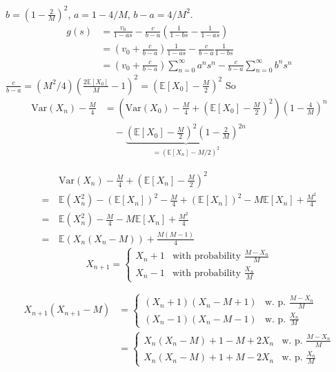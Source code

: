 \documentclass[letterpaper]{beamer}
\def\E{\mathbb E}
\def\V{\mathrm{Var}}
\begin{document}
\begin{frame}
$b=(1-\frac{2}{M})^2$, $a=1-4/M$, $b-a=4/M^2$.
\begin{align*}
g(s)&=\frac{v_0}{1-as}-\frac{c}{b-a}\left(\frac{1}{1-bs}-\frac{1}{1-as}\right)\\
&=\left(v_0+\frac{c}{b-a}\right)\frac{1}{1-as}-\frac{c}{b-a}\frac{1}{1-bs}\\
&=\left(v_0+\frac{c}{b-a}\right)\sum_{n=0}^{\infty}a^ns^n-\frac{c}{b-a}\sum_{n=0}^{\infty}b^ns^n
\end{align*}
$\frac{c}{b-a}=(M^2/4)\left(\frac{2\E[X_{0}]}{M}-1\right)^2=\left(\E[X_{0}]-\frac{M}{2}\right)^2$
So
\begin{align*}
\V(X_n)-\frac{M}{4}&=\left(\V(X_0)-\frac{M}{4}+\left(\E[X_{0}]-\frac{M}{2}\right)^2\right)\left(1-\frac{4}{M}\right)^n\\
&\quad-\underbrace{\left(\E[X_{0}]-\frac{M}{2}\right)^2\left(1-\frac{2}{M}\right)^{2n}}_{=(\E[X_n]-M/2)^2}
\end{align*}

\end{frame}
\begin{frame}
\begin{align*}
&\V(X_n)-\frac{M}{4}+(\E[X_n]-\frac{M}{2})^2\\
=\,&\E(X_n^2)-(\E[X_n])^2-\frac{M}{4}+(\E[X_n])^2-M\E[X_n]+\frac{M^2}{4}\\
=\,&\E(X_n^2)-\frac{M}{4}-M\E[X_n]+\frac{M^2}{4}\\
=\,&\E(X_n(X_n-M))+\frac{M(M-1)}{4}
\end{align*}
$$
X_{n+1}=
\begin{cases}
X_n+1 & \text{with probability } \frac{M-X_n}{M}\\
X_n-1 & \text{with probability } \frac{X_n}{M}
\end{cases}
$$

\begin{align*}
X_{n+1}(X_{n+1}-M)&=
\begin{cases}
(X_n+1)(X_n-M+1) & \text{w. p. } \frac{M-X_n}{M}\\
(X_n-1)(X_n-M-1) & \text{w. p. } \frac{X_n}{M}
\end{cases}\\
&=
\begin{cases}
X_n(X_n-M)+1-M+2X_n & \text{w. p. } \frac{M-X_n}{M}\\
X_n(X_n-M)+1+M-2X_n & \text{w. p. } \frac{X_n}{M}
\end{cases}\\
\end{align*}
\end{frame}
\end{document}
